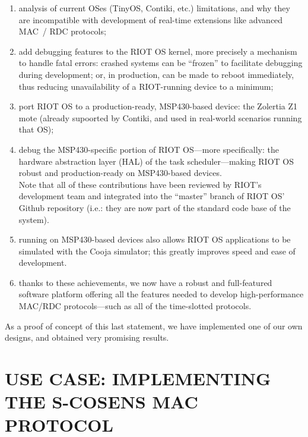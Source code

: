 \documentclass[a4paper,twoside]{article}
\begin{document}
\begin{enumerate}

\item analysis of current OSes (TinyOS, Contiki, etc.) limitations,
      and why they are incompatible with development of real-time
      extensions like advanced MAC~/ RDC protocols;

\item add debugging features to the RIOT OS kernel, more precisely
      a mechanism to handle fatal errors: crashed systems can be
      ``frozen'' to facilitate debugging during development; or,
      in production, can be made to reboot immediately, thus reducing
      unavailability of a RIOT-running device to a minimum;

\item port RIOT OS to a production-ready, MSP430-based device:
      the Zolertia Z1 mote (already supoorted by Contiki,
      and used in real-world scenarios running that OS);

\item debug the MSP430-specific portion of RIOT OS---more specifically:
      the hardware abstraction layer (HAL) of the task scheduler---making
      RIOT OS robust and production-ready on MSP430-based devices.\\
      Note that all of  these contributions have been reviewed by RIOT's
      development team and integrated into the ``master'' branch of RIOT OS'
      Github repository (i.e.: they are now part of the standard code base of
      the system).

\item running on MSP430-based devices also allows RIOT OS applications
      to be simulated with the Cooja simulator; this greatly improves
      speed and ease of development.

\item thanks to these achievements, we now have a robust and full-featured
      software platform offering all the features needed to develop
      high-performance MAC/RDC protocols---such as all of the time-slotted
      protocols.

\end{enumerate}

As a proof of concept of this last statement, we have implemented one
of our own designs, and obtained very promising results.


\section{\uppercase{Use Case: implementing the S-CoSenS MAC protocol}}
\end{document}
